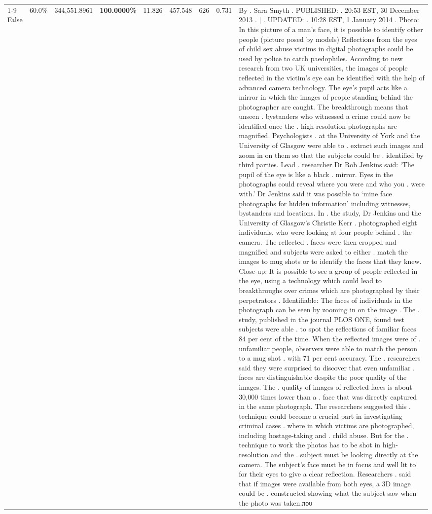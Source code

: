 \begin{table}[H]
\begin{tabular}{lllrlllll}
\cline{1-9}
False & 60.0\% & 344,551.8961 & \bfseries \color{red} 100.0000\% & 11.826 & 457.548 & 626 & 0.731 & By . Sara Smyth . PUBLISHED: . 20:53 EST, 30 December 2013 . | . UPDATED: . 10:28 EST, 1 January 2014 . Photo: In this picture of a man's face, it is possible to identify other people (picture posed by models) Reflections from the eyes of child sex abuse victims in digital photographs could be used by police to catch paedophiles. According to new research from two UK universities, the images of people reflected in the victim's eye can be identified with the help of advanced camera technology. The eye's pupil acts like a mirror in which the images of people standing behind the photographer are caught. The breakthrough means that unseen . bystanders who witnessed a crime could now be identified once the . high-resolution photographs are magnified. Psychologists . at the University of York and the University of Glasgow were able to . extract such images and zoom in on them so that the subjects could be . identified by third parties. Lead . researcher Dr Rob Jenkins said: ‘The pupil of the eye is like a black . mirror. Eyes in the photographs could reveal where you were and who you . were with.' Dr Jenkins said it was possible to ‘mine face photographs for hidden information' including witnesses, bystanders and locations. In . the study, Dr Jenkins and the University of Glasgow's Christie Kerr . photographed eight individuals, who were looking at four people behind . the camera. The reflected . faces were then cropped and magnified and subjects were asked to either . match the images to mug shots or to identify the faces that they knew. Close-up: It is possible to see a group of people reflected in the eye, using a technology which could lead to breakthroughs over crimes which are photographed by their perpetrators . Identifiable: The faces of individuals in the photograph can be seen by zooming in on the image . The . study, published in the journal PLOS ONE, found test subjects were able . to spot the reflections of familiar faces 84 per cent of the time. When the reflected images were of . unfamiliar people, observers were able to match the person to a mug shot . with 71 per cent accuracy. The . researchers said they were surprised to discover that even unfamiliar . faces are distinguishable despite the poor quality of the images. The . quality of images of reflected faces is about 30,000 times lower than a . face that was directly captured in the same photograph. The researchers suggested this . technique could become a crucial part in investigating criminal cases . where in which victims are photographed, including hostage-taking and . child abuse. But for the . technique to work the photos has to be shot in high-resolution and the . subject must be looking directly at the camera. The subject's face must be in focus and well lit to for their eyes to give a clear reflection. Researchers . said that if images were available from both eyes, a 3D image could be . constructed showing what the subject saw when the photo was taken.που \\

\end{tabular}
\end{table}
